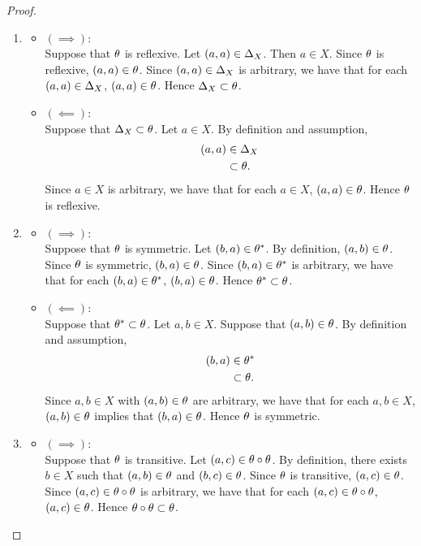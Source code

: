 \begin{proof}\
	\begin{enumerate}
		\item 
		\begin{itemize}
			\item $(\implies)$: \\
			Suppose that $\theta$ is reflexive. Let $(a,a) \in \Delta_X$. Then $a \in X$. Since $\theta$ is reflexive, $(a,a) \in \theta$. Since $(a,a) \in \Delta_X$ is arbitrary, we have that for each $(a,a) \in \Delta_X$, $(a,a) \in \theta$. Hence $\Delta_X \subset \theta$. 
			\item $(\impliedby)$: \\
			Suppose that $\Delta_X \subset \theta$. Let $a \in X$. By definition and assumption, 
			\begin{align*}
				(a,a)
				& \in \Delta_X \\
				& \subset \theta.
			\end{align*}
			Since $a \in X$ is arbitrary, we have that for each $a \in X$, $(a,a) \in \theta$. Hence $\theta$ is reflexive.
		\end{itemize}
		\item 
		\begin{itemize}
			\item $(\implies)$: \\
			Suppose that $\theta$ is symmetric. Let $(b,a) \in \theta^*$. By definition, $(a,b) \in \theta$. Since $\theta$ is symmetric, $(b,a) \in \theta$. Since $(b,a) \in \theta^*$ is arbitrary, we have that for each $(b,a) \in \theta^*$, $(b,a) \in \theta$. Hence $\theta^* \subset \theta$. 
			\item $(\impliedby)$: \\
			Suppose that $\theta^* \subset \theta$. Let $a,b \in X$. Suppose that $(a,b) \in \theta$. By definition and assumption, 
			\begin{align*}
				(b,a) 
				& \in \theta^* \\
				& \subset \theta. 
			\end{align*}
			Since $a,b \in X$ with $(a,b) \in \theta$ are arbitrary, we have that for each $a,b \in X$, $(a,b) \in \theta$ implies that $(b,a) \in \theta$. Hence $\theta$ is symmetric.
		\end{itemize}
		\item 
		\begin{itemize}
			\item $(\implies)$: \\
			Suppose that $\theta$ is transitive. Let $(a,c) \in \theta \circ \theta$. By definition, there exists $b \in X$ such that $(a,b) \in \theta$ and $(b,c) \in \theta$. Since $\theta$ is transitive, $(a,c) \in \theta$. Since $(a,c) \in \theta \circ \theta$ is arbitrary, we have that for each $(a,c) \in \theta \circ \theta$, $(a,c) \in \theta$. Hence $\theta \circ \theta \subset \theta$. 

\end{itemize}
\end{enumerate}
\end{proof}
